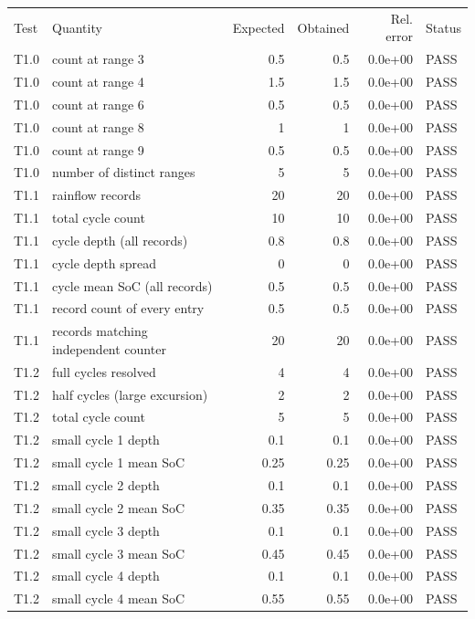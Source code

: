 \begin{tabular}{llrrrl}
\hline\noalign{\smallskip}
Test & Quantity & Expected & Obtained & Rel. error & Status \\
\noalign{\smallskip}\hline\noalign{\smallskip}
T1.0 & count at range 3 & 0.5 & 0.5 & 0.0e+00 & PASS \\
T1.0 & count at range 4 & 1.5 & 1.5 & 0.0e+00 & PASS \\
T1.0 & count at range 6 & 0.5 & 0.5 & 0.0e+00 & PASS \\
T1.0 & count at range 8 & 1 & 1 & 0.0e+00 & PASS \\
T1.0 & count at range 9 & 0.5 & 0.5 & 0.0e+00 & PASS \\
T1.0 & number of distinct ranges & 5 & 5 & 0.0e+00 & PASS \\
T1.1 & rainflow records & 20 & 20 & 0.0e+00 & PASS \\
T1.1 & total cycle count & 10 & 10 & 0.0e+00 & PASS \\
T1.1 & cycle depth (all records) & 0.8 & 0.8 & 0.0e+00 & PASS \\
T1.1 & cycle depth spread & 0 & 0 & 0.0e+00 & PASS \\
T1.1 & cycle mean SoC (all records) & 0.5 & 0.5 & 0.0e+00 & PASS \\
T1.1 & record count of every entry & 0.5 & 0.5 & 0.0e+00 & PASS \\
T1.1 & records matching independent counter & 20 & 20 & 0.0e+00 & PASS \\
T1.2 & full cycles resolved & 4 & 4 & 0.0e+00 & PASS \\
T1.2 & half cycles (large excursion) & 2 & 2 & 0.0e+00 & PASS \\
T1.2 & total cycle count & 5 & 5 & 0.0e+00 & PASS \\
T1.2 & small cycle 1 depth & 0.1 & 0.1 & 0.0e+00 & PASS \\
T1.2 & small cycle 1 mean SoC & 0.25 & 0.25 & 0.0e+00 & PASS \\
T1.2 & small cycle 2 depth & 0.1 & 0.1 & 0.0e+00 & PASS \\
T1.2 & small cycle 2 mean SoC & 0.35 & 0.35 & 0.0e+00 & PASS \\
T1.2 & small cycle 3 depth & 0.1 & 0.1 & 0.0e+00 & PASS \\
T1.2 & small cycle 3 mean SoC & 0.45 & 0.45 & 0.0e+00 & PASS \\
T1.2 & small cycle 4 depth & 0.1 & 0.1 & 0.0e+00 & PASS \\
T1.2 & small cycle 4 mean SoC & 0.55 & 0.55 & 0.0e+00 & PASS \\

\end{tabular}
